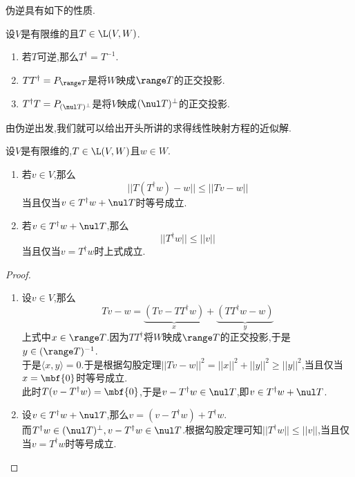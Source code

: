 \documentclass{ctexart}
\begin{document}
伪逆具有如下的性质.
\begin{formal}[3.3 伪逆的性质]
    设$V$是有限维的且$T\in\L(V,W)$.
    \begin{enumerate}[label=\tbf{(\arabic*)}]
        \item 若$T$可逆,那么$T^\dagger=T^{-1}$.
        \item $TT^\dagger=P_{\range T}$是将$W$映成$\range T$的正交投影.
        \item $T^\dagger T=P_{(\nul T)^\bot}$是将$V$映成$(\nul T)^\bot$的正交投影.
    \end{enumerate}
\end{formal}\noindent
由伪逆出发,我们就可以给出开头所讲的求得线性映射方程的近似解.
\begin{formal}[3.4 伪逆可给出最佳近似解或最优解]
    设$V$是有限维的,$T\in\L(V,W)$且$w\in W$.
    \begin{enumerate}[label=\tbf{(\arabic*)}]
        \item 若$v\in V$,那么$$||T(T^\dagger w)-w||\leqslant||Tv-w||$$
            当且仅当$v\in T^\dagger w+\nul T$时等号成立.
        \item 若$v\in T^\dagger w+\nul T$,那么
            $$||T^\dagger w||\leqslant ||v||$$当且仅当$v=T^\dagger w$时上式成立.
    \end{enumerate}
\end{formal}
\begin{proof}
    \begin{enumerate}[label=\tbf{(\arabic*)}]
        \item 设$v\in V$,那么$$Tv-w=\underbrace{(Tv-TT^\dagger w)}_x+\underbrace{(TT^\dagger w-w)}_y$$
            上式中$x\in\range T$.因为$TT^\dagger$将$W$映成$\range T$的正交投影,于是$y\in(\range T)^{-1}$.\\
            于是$\langle x,y\rangle=0$.于是根据勾股定理$||Tv-w||^2=||x||^2+||y||^2\geqslant||y||^2$,当且仅当$x=\mbf{0}$时等号成立.\\
            此时$T(v-T^\dagger w)=\mbf{0}$,于是$v-T^\dagger w\in\nul T$,即$v\in T^\dagger w+\nul T$.
        \item 设$v\in T^\dagger w+\nul T$,那么$v=(v-T^\dagger w)+T^\dagger w$.\\
            而$T^\dagger w\in(\nul T)^\bot,v-T^\dagger w\in\nul T$.根据勾股定理可知$||T^\dagger w||\leqslant||v||$,当且仅当$v=T^\dagger w$时等号成立.
    \end{enumerate}
\end{proof}
\end{document}

